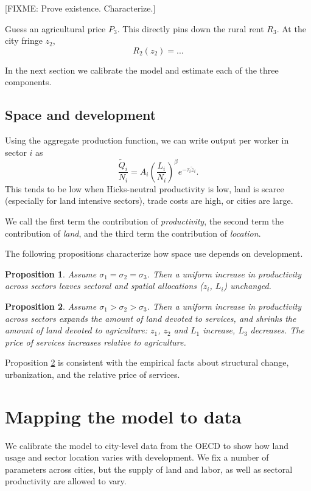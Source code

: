 \documentclass[12pt]{article}
\newtheorem{proposition}{Proposition}
\begin{document}
[FIXME: Prove existence. Characterize.]

Guess an agricultural price $P_3$. This directly pins down the rural rent $R_3$. At the city fringe $z_2$,
\[
R_2(z_2)=...
\]

In the next section we calibrate the model and estimate each of the three components.


\subsection{Space and development}
Using the aggregate production function, we can write output per worker in sector $i$ as
\begin{equation}\label{eq:output_per_worker}
\frac{\tilde Q_i}{N_i} = 
A_i
 \left(
 \frac{L_i}
 {N_i}\right)^{\beta}e^{-\tau_i\tilde z_i}.
\end{equation}
This tends to be low when Hicks-neutral productivity is low, land is scarce (especially for land intensive sectors), trade costs are high, or cities are large.

We call the first term the contribution of \emph{productivity}, the second term the contribution of \emph{land}, and the third term the contribution of \emph{location}. 

The following propositions characterize how space use depends on development.
\begin{proposition}\label{prop:balanced_growth}
Assume $\sigma_1=\sigma_2=\sigma_3$. Then a uniform increase in productivity across sectors leaves sectoral and spatial allocations ($z_i$, $L_i$) unchanged.
\end{proposition}

\begin{proposition}\label{prop:comparative_static}
Assume $\sigma_1>\sigma_2>\sigma_3$. Then a uniform increase in productivity across sectors expands the amount of land devoted to services, and shrinks the amount of land devoted to agriculture: $z_1$, $z_2$ and $L_1$ increase, $L_3$ decreases. The price of services increases relative to agriculture.
\end{proposition}

Proposition \ref{prop:comparative_static} is consistent with the empirical facts about structural change, urbanization, and the relative price of services. 



\section{Mapping the model to data}
We calibrate the model to city-level data from the OECD to show how land usage and sector location varies with development. We fix a number of parameters across cities, but the supply of land and labor, as well as sectoral productivity are allowed to vary.
\end{document}
